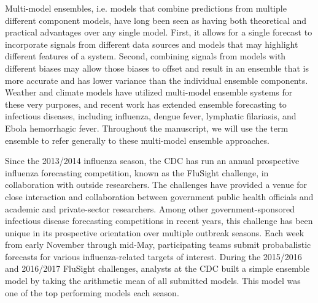 \documentclass{article}\usepackage[]{graphicx}\usepackage[]{color}
\begin{document}
Multi-model ensembles, i.e. models that combine predictions from multiple different component models, have long been seen as having both theoretical and practical advantages over any single model.\cite{bates1969combination,Wolpert1992,Polikar2006,Hastie2009}
First, it allows for a single forecast to incorporate signals from different data sources and models that may highlight different features of a system. 
Second, combining signals from models with different biases may allow those biases to offset and result in an ensemble that is more accurate and has lower variance than the individual ensemble components. Weather and climate models have utilized multi-model ensemble systems for these very purposes\cite{krishnamurti1999improved,Palmer2002,Raftery2005,Leutbecher2008}, and recent work has extended ensemble forecasting to infectious diseases, including influenza, dengue fever, lymphatic filariasis, and Ebola hemorrhagic fever.\cite{Yamana2017,Smith2017,Viboud2017,Ray2018} 
Throughout the manuscript, we will use the term ensemble to refer generally to these multi-model ensemble approaches.

Since the 2013/2014 influenza season, the CDC has run an annual prospective influenza forecasting competition, known as the FluSight challenge, in collaboration with outside researchers. 
The challenges have provided a venue for close interaction and collaboration between government public health officials and academic and private-sector researchers. 
Among other government-sponsored infectious disease forecasting competitions in recent years,\cite{DARPA2015,NOAA} this challenge has been unique in its prospective orientation over multiple outbreak seasons.
Each week from early November through mid-May, participating teams submit probabalistic forecasts for various influenza-related targets of interest.
During the 2015/2016 and 2016/2017 FluSight challenges, analysts at the CDC built a simple ensemble model by taking the arithmetic mean of all submitted models. 
This model was one of the top performing models each season.\cite{McGowan2018}
\end{document}
